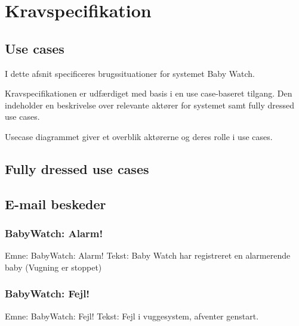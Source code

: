 \chapter{Kravspecifikation}


\newpage
\section{Use cases}

I dette afsnit specificeres brugssituationer for systemet Baby Watch.

Kravspecifikationen er udfærdiget med basis i en use case-baseret tilgang. Den indeholder en beskrivelse over relevante aktører for systemet samt fully dressed use cases.


Usecase diagrammet giver et overblik aktørerne og deres rolle i use cases.


\newpage
\section{Fully dressed use cases}

\newpage

\newpage

\newpage




\section{E-mail beskeder}

\subsection*{BabyWatch: Alarm!}

Emne: BabyWatch: Alarm! \newline
Tekst: Baby Watch har registreret en alarmerende baby (Vugning er stoppet)

\subsection*{BabyWatch: Fejl!}

Emne: BabyWatch: Fejl! \newline
Tekst: Fejl i vuggesystem, afventer genstart.



